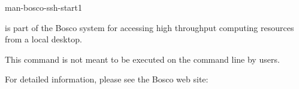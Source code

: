\begin{ManPage}{}{man-bosco-ssh-start}{1}
{}


\Synopsis {}

\Description

{ is part of the Bosco system for accessing high
throughput computing resources from a local desktop.

This command is not meant to be executed on the command line by users.

For detailed information, please see the Bosco web site:
}


\end{ManPage}
